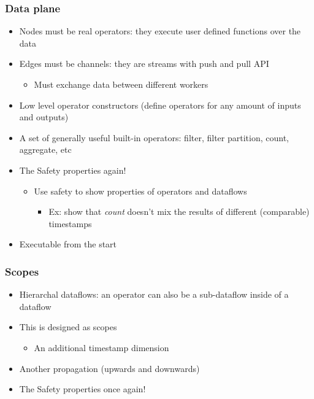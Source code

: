 \documentclass[aspectratio=169,10pt]{beamer}
\begin{document}
\begin{frame}
  \frametitle{Data plane}
  \begin{itemize}
    \item Nodes must be real operators: they execute user defined functions over the data
    \item Edges must be channels: they are streams with push and pull API
          \begin{itemize}
            \item Must exchange data between different workers
          \end{itemize}
    \item Low level operator constructors (define operators for any amount of inputs and outputs)
    \item A set of generally useful built-in operators: filter, filter partition, count, aggregate, etc
    \item The Safety properties again!
          \begin{itemize}
            \item Use safety to show properties of operators and dataflows
                  \begin{itemize}
                    \item Ex: show that \textit{count} doesn't mix the results of different (comparable) timestamps
                  \end{itemize}
          \end{itemize}
    \item Executable from the start
  \end{itemize}
\end{frame}

\begin{frame}
  \frametitle{Scopes}
  \begin{itemize}
    \item Hierarchal dataflows: an operator can also be a sub-dataflow inside of a dataflow
    \item This is designed as scopes
          \begin{itemize}
            \item An additional timestamp dimension
          \end{itemize}
    \item Another propagation (upwards and downwards)
    \item The Safety properties once again!
  \end{itemize}
\end{frame}
\end{document}
